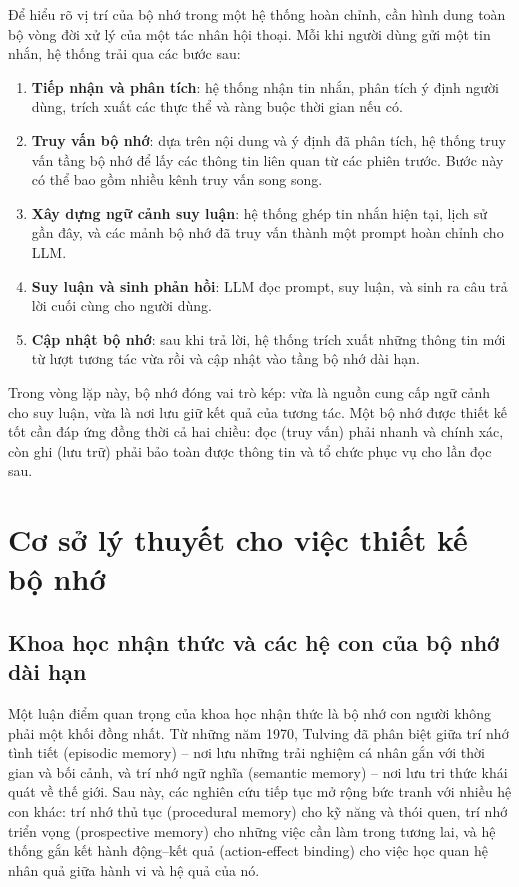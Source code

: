 \documentclass[../main.tex]{subfiles}
\begin{document}
Để hiểu rõ vị trí của bộ nhớ trong một hệ thống hoàn chỉnh, cần hình dung toàn bộ vòng đời xử lý của một tác nhân hội thoại. Mỗi khi người dùng gửi một tin nhắn, hệ thống trải qua các bước sau:

\begin{enumerate}
    \item \textbf{Tiếp nhận và phân tích}: hệ thống nhận tin nhắn, phân tích ý định người dùng, trích xuất các thực thể và ràng buộc thời gian nếu có.
    \item \textbf{Truy vấn bộ nhớ}: dựa trên nội dung và ý định đã phân tích, hệ thống truy vấn tầng bộ nhớ để lấy các thông tin liên quan từ các phiên trước. Bước này có thể bao gồm nhiều kênh truy vấn song song.
    \item \textbf{Xây dựng ngữ cảnh suy luận}: hệ thống ghép tin nhắn hiện tại, lịch sử gần đây, và các mảnh bộ nhớ đã truy vấn thành một prompt hoàn chỉnh cho LLM.
    \item \textbf{Suy luận và sinh phản hồi}: LLM đọc prompt, suy luận, và sinh ra câu trả lời cuối cùng cho người dùng.
    \item \textbf{Cập nhật bộ nhớ}: sau khi trả lời, hệ thống trích xuất những thông tin mới từ lượt tương tác vừa rồi và cập nhật vào tầng bộ nhớ dài hạn.
\end{enumerate}

Trong vòng lặp này, bộ nhớ đóng vai trò kép: vừa là nguồn cung cấp ngữ cảnh cho suy luận, vừa là nơi lưu giữ kết quả của tương tác. Một bộ nhớ được thiết kế tốt cần đáp ứng đồng thời cả hai chiều: đọc (truy vấn) phải nhanh và chính xác, còn ghi (lưu trữ) phải bảo toàn được thông tin và tổ chức phục vụ cho lần đọc sau.

\section{Cơ sở lý thuyết cho việc thiết kế bộ nhớ}

\subsection{Khoa học nhận thức và các hệ con của bộ nhớ dài hạn}

Một luận điểm quan trọng của khoa học nhận thức là bộ nhớ con người không phải một khối đồng nhất. Từ những năm 1970, Tulving đã phân biệt giữa trí nhớ tình tiết (episodic memory) -- nơi lưu những trải nghiệm cá nhân gắn với thời gian và bối cảnh, và trí nhớ ngữ nghĩa (semantic memory) -- nơi lưu tri thức khái quát về thế giới. Sau này, các nghiên cứu tiếp tục mở rộng bức tranh với nhiều hệ con khác: trí nhớ thủ tục (procedural memory) cho kỹ năng và thói quen, trí nhớ triển vọng (prospective memory) cho những việc cần làm trong tương lai, và hệ thống gắn kết hành động--kết quả (action-effect binding) cho việc học quan hệ nhân quả giữa hành vi và hệ quả của nó.
\end{document}
